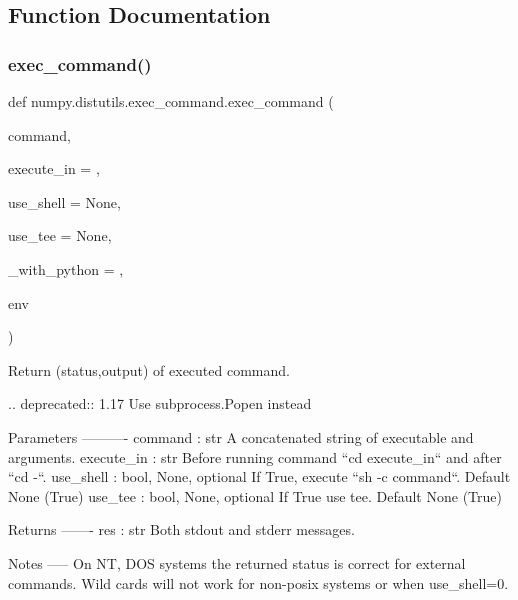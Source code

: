 \subsection{Function Documentation}
\mbox{\label{namespacenumpy_1_1distutils_1_1exec__command_ac3ebe717bf449d45c7f3c6ace8252b16}} 
\subsubsection{\texorpdfstring{exec\+\_\+command()}{exec\_command()}}
{\footnotesize\ttfamily def numpy.\+distutils.\+exec\+\_\+command.\+exec\+\_\+command (\begin{DoxyParamCaption}\item[{}]{command,  }\item[{}]{execute\+\_\+in = {\ttfamily \textquotesingle{}\textquotesingle{}},  }\item[{}]{use\+\_\+shell = {\ttfamily None},  }\item[{}]{use\+\_\+tee = {\ttfamily None},  }\item[{}]{\+\_\+with\+\_\+python = {},  }\item[{}]{env }\end{DoxyParamCaption})}

\begin{DoxyVerb}Return (status,output) of executed command.

.. deprecated:: 1.17
    Use subprocess.Popen instead

Parameters
----------
command : str
    A concatenated string of executable and arguments.
execute_in : str
    Before running command ``cd execute_in`` and after ``cd -``.
use_shell : {bool, None}, optional
    If True, execute ``sh -c command``. Default None (True)
use_tee : {bool, None}, optional
    If True use tee. Default None (True)


Returns
-------
res : str
    Both stdout and stderr messages.

Notes
-----
On NT, DOS systems the returned status is correct for external commands.
Wild cards will not work for non-posix systems or when use_shell=0.\end{DoxyVerb}
 \mbox{\label{namespacenumpy_1_1distutils_1_1exec__command_a8ab80ad3b0509e86b733672611ff9642}} 
